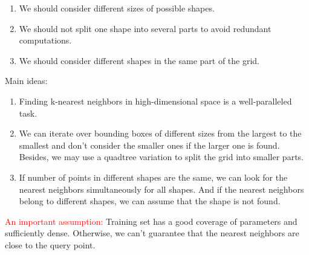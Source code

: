 \documentclass{article}
\begin{document}
\begin{enumerate}
\item We should consider different sizes of possible shapes.
\item We should not split one shape into several parts to avoid redundant computations.
\item We should consider different shapes in the same part of the grid.
\end{enumerate}

\vspace{15mm}
Main ideas:

\begin{enumerate}
\item Finding k-nearest neighbors in high-dimensional space is a well-paralleled task.
\item We can iterate over bounding boxes of different sizes from the largest to the smallest and don't consider the smaller ones if the larger one is found. Besides, we may use a quadtree variation to split the grid into smaller parts.
\item If number of points in different shapes are the same, we can look for the nearest neighbors simultaneously for all shapes.
And if the nearest neighbors belong to different shapes, we can assume that the shape is not found.
\end{enumerate}


\textcolor{red}{An important assumption:} Training set has a good coverage of parameters and sufficiently dense. Otherwise, we can't guarantee that the nearest neighbors are close to the query point.
\end{document}
